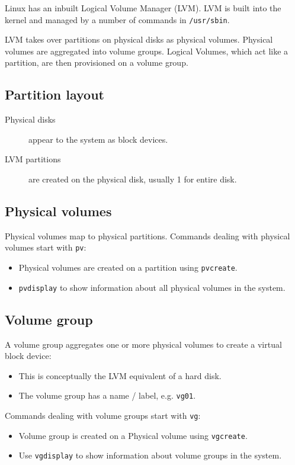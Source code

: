 \documentclass[slides]{pgnotes}
\begin{document}
Linux has an inbuilt Logical Volume Manager (LVM). LVM is built into the
kernel and managed by a number of commands in \texttt{/usr/sbin}.

LVM takes over partitions on physical disks as physical volumes.
Physical volumes are aggregated into volume groups. Logical Volumes,
which act like a partition, are then provisioned on a volume group.

\subsection{Partition layout}
\begin{description}
\item[Physical disks]
appear to the system as block devices.
\item[LVM partitions]
are created on the physical disk, usually 1 for entire disk. 
\end{description}

\subsection{Physical volumes}

Physical volumes map to physical partitions.
Commands dealing with physical volumes start with \texttt{pv}:
\begin{itemize}
\item  Physical volumes are created on a partition using \texttt{pvcreate}.
\item \texttt{pvdisplay} to show information about all physical volumes in the system.
\end{itemize}

\subsection{Volume group}

A volume group aggregates one or more physical volumes to create a virtual block device:
\begin{itemize}
\item This is conceptually the LVM equivalent of a hard disk.
\item The volume group has a name / label, e.g. \texttt{vg01}.
\end{itemize}

Commands dealing with volume groups start with \texttt{vg}:
\begin{itemize}
\item Volume group is created on a Physical volume using \texttt{vgcreate}.
\item Use \texttt{vgdisplay} to show information about volume groups in the system.
\end{itemize}
\end{document}
